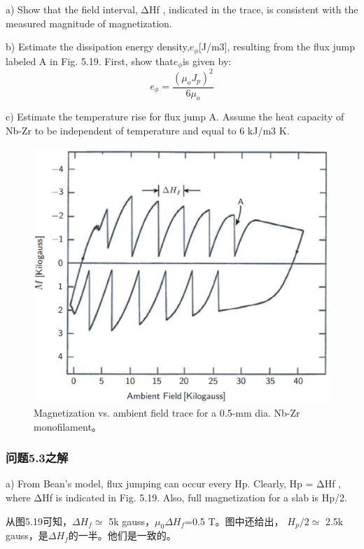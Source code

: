 a) Show that the field interval, ΔHf , indicated in the trace, is consistent with
the measured magnitude of magnetization.

b) Estimate the dissipation energy density,$e_{\phi}$[J/m3], resulting from the flux
jump labeled A in Fig. 5.19. First, show that$e_{\phi}$is given by:
\begin{equation}%
e_{\phi}=\frac{(\mu_{o}J_{p})^{2}}{6\mu_{o}}
\end{equation}

c) Estimate the temperature rise for flux jump A. Assume the heat capacity of
Nb-Zr to be independent of temperature and equal to 6 kJ/m3 K.

\begin{figure}[htbp]
	\centering
	\includegraphics[scale=0.5]{chpt5/figs/fig5.19.eps}
	\caption{Magnetization vs. ambient field trace for a 0.5-mm dia. Nb-Zr monofilament。}
\end{figure}


\subsubsection{问题5.3之解}
a) From Bean’s model, flux jumping can occur every Hp. Clearly, Hp = ΔHf ,
where ΔHf is indicated in Fig. 5.19. Also, full magnetization for a slab is Hp/2.

从图5.19可知，$\Delta H_f\simeq$ 5k gauss，$\mu_{0}\Delta H_f$=0.5 T。图中还给出，
$H_p/2\simeq$ 2.5k gauss，是$\Delta H_f$的一半。他们是一致的。

